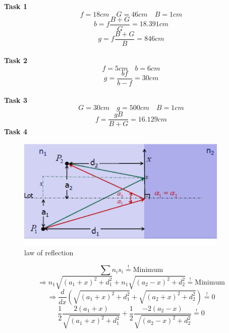 \documentclass{scrreprt}
\begin{document}
\textbf{Task 1}
\begin{equation}
	f=18cm\quad G=46cm\quad B=1cm
\end{equation}
\begin{equation}
	b=f\frac{B+G}{G}=18.391cm
\end{equation}
\begin{equation}
	g=f\frac{B+G}{B}=846cm
\end{equation}
\\
\textbf{Task 2}
\begin{equation}
	f=5cm\quad b=6cm
\end{equation}
\begin{equation}
	g=\frac{bf}{b-f}=30cm
\end{equation}
\\
\textbf{Task 3}
\begin{equation}
	G=30cm\quad g=500cm\quad B=1cm
\end{equation}
\begin{equation}
	f=\frac{gB}{B+G}=16.129cm
\end{equation}
\textbf{Task 4}
\begin{figure}[H]
	\centering
  \includegraphics[width=0.9\textwidth]{diag/exercises1.pdf}
	\caption{law of reflection}
\end{figure}
\begin{equation}
\sum n_i s_i \stackrel{!}= \mbox{Minimum}
\end{equation}
\begin{equation}
\Rightarrow n_1 \sqrt{(a_1+x)^2+d_1^2}+n_1\sqrt{(a_2-x)^2+d_2^2} \stackrel{!}= \mbox{Minimum}
\end{equation}
\begin{equation}
\Rightarrow \frac{d}{dx} \left(\sqrt{(a_1+x)^2+d_1^2}+\sqrt{(a_2+x)^2+d_2^2}\right) \stackrel{!}= 0
\end{equation}
\begin{equation}
\frac{1}{2} \frac{2(a_1+x)}{\sqrt{(a_1+x)^2+d_1^2}}+\frac{1}{2} \frac{-2(a_2-x)}{\sqrt{(a_2-x)^2+d_2^2}} \stackrel{!}= 0
\end{equation}
\end{document}
